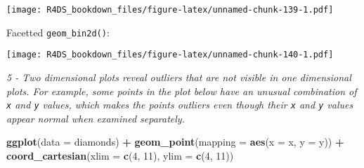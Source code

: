 \documentclass[]{article}
\newenvironment{Shaded}{\begin{snugshade}}{\end{snugshade}}
\newcommand{\KeywordTok}[1]{\textcolor[rgb]{0.13,0.29,0.53}{\textbf{#1}}}
\newcommand{\DataTypeTok}[1]{\textcolor[rgb]{0.13,0.29,0.53}{#1}}
\newcommand{\DecValTok}[1]{\textcolor[rgb]{0.00,0.00,0.81}{#1}}
\newcommand{\StringTok}[1]{\textcolor[rgb]{0.31,0.60,0.02}{#1}}
\newcommand{\OperatorTok}[1]{\textcolor[rgb]{0.81,0.36,0.00}{\textbf{#1}}}
\newcommand{\NormalTok}[1]{#1}
\theoremstyle{definition}
\theoremstyle{definition}
\theoremstyle{definition}
\theoremstyle{remark}
\begin{document}
\begin{Shaded}
\end{Shaded}

\texttt{[image: R4DS\_bookdown\_files/figure-latex/unnamed-chunk-139-1.pdf]}

Facetted \texttt{geom\_bin2d()}:

\begin{Shaded}
\end{Shaded}

\texttt{[image: R4DS\_bookdown\_files/figure-latex/unnamed-chunk-140-1.pdf]}

\emph{5 - Two dimensional plots reveal outliers that are not visible in
one dimensional plots. For example, some points in the plot below have
an unusual combination of \texttt{x} and \texttt{y} values, which makes
the points outliers even though their \texttt{x} and \texttt{y} values
appear normal when examined separately.}

\begin{Shaded}
\begin{Highlighting}[]
\KeywordTok{ggplot}\NormalTok{(}\DataTypeTok{data =}\NormalTok{ diamonds) }\OperatorTok{+}
\StringTok{  }\KeywordTok{geom_point}\NormalTok{(}\DataTypeTok{mapping =} \KeywordTok{aes}\NormalTok{(}\DataTypeTok{x =}\NormalTok{ x, }\DataTypeTok{y =}\NormalTok{ y)) }\OperatorTok{+}
\StringTok{  }\KeywordTok{coord_cartesian}\NormalTok{(}\DataTypeTok{xlim =} \KeywordTok{c}\NormalTok{(}\DecValTok{4}\NormalTok{, }\DecValTok{11}\NormalTok{), }\DataTypeTok{ylim =} \KeywordTok{c}\NormalTok{(}\DecValTok{4}\NormalTok{, }\DecValTok{11}\NormalTok{))}
\end{Highlighting}
\end{Shaded}
\end{document}
